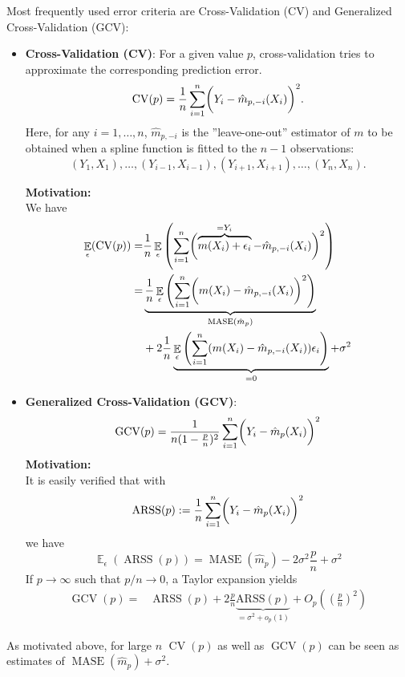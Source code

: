 \documentclass[14pt]{extreport}\usepackage[]{graphicx}\usepackage[]{xcolor}
\DeclareMathOperator{\E}{\mathbb{E}}
\begin{document}
Most frequently used error criteria are Cross-Validation (CV) and Generalized Cross-Validation (GCV): 
\begin{itemize}
\item {\bf Cross-Validation (CV)}:
For a given value $p$, cross-validation tries to approximate the corresponding prediction error.
$$
\operatorname{CV}(p)={1 \over n} \sum_{i=1}^n\biggl( Y_i-
{\hat m}_{p,-i}(X_i)\biggr)^2.
$$
Here, for any $i=1,\dots,n$, ${\hat m}_{p,-i}$ is the ''leave-one-out'' estimator of
$m$ to be obtained when a spline function is fitted to the $n-1$
observations:
$$
(Y_1,X_1),\dots,(Y_{i-1},X_{i-1}),(Y_{i+1},X_{i+1}),\dots,(Y_{n},X_{n}).
$$

\bigskip
\newpage

\textbf{Motivation:}\\
We have
\begin{align*}
\E_\epsilon(\operatorname{CV}(p))= &{1 \over n} \E_\epsilon\left(\sum_{i=1}^n\biggl( \overbrace{m(X_i)+\epsilon_i}^{=Y_i}-
{\hat m}_{p,-i}(X_i)\biggr)^2\right)\\
= &\underbrace{{1 \over n} \E_\epsilon\left(\sum_{i=1}^n\biggl(m(X_i)-
{\hat m}_{p,-i}(X_i)\biggr)^2\right)}_{\operatorname{MASE}(\hat m_p)} \\
&+ 2{1 \over n}
\underbrace{\E_\epsilon\left(\sum_{i=1}^n( m(X_i)-
{\hat m}_{p,-i}(X_i))\epsilon_i\right)}_{=0}+\sigma^2
\end{align*}


\item {\bf Generalized Cross-Validation (GCV)}:
$$
\operatorname{GCV}(p)={1\over n(1-{p\over n})^2}\sum_{i=1}^n \biggl( Y_i-
{\hat m}_p(X_i)\biggr)^2
$$
\textbf{Motivation:}\\
It is easily verified that with
$$\operatorname{ARSS}(p):={1 \over n}\sum_{i=1}^n\biggl( Y_i-
{\hat m}_{p}(X_i)\biggr)^2$$
 we have
$$
\E_\epsilon(\operatorname{ARSS}(p))=\operatorname{MASE}(\hat m_p)-2\sigma^2\frac{p}{n}+\sigma^2
$$
If $p\rightarrow\infty$ such that $p/n\rightarrow 0$, a Taylor expansion yields
\begin{align*}
\operatorname{GCV}(p)= &\operatorname{ARSS}(p)+2\frac{p}{n}\underbrace{\text{ARSS}(p)}_{=\sigma^2+o_p(1)}+O_p\left(\left(\frac{p}{n}\right)^2\right)
\end{align*}
\end{itemize}

\bigbreak


As motivated above, for large $n$
 $\operatorname{CV}(p)$ as well as $\operatorname{GCV}(p)$ can be seen as estimates of
$\operatorname{MASE}(\hat m_p)+\sigma^2$. 
\end{document}
